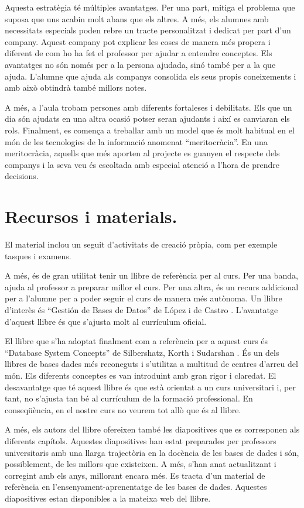 \documentclass[catalan, a4paper, 12pt, titlepage]{article}
\begin{document}
Aquesta estratègia té múltiples avantatges. 
Per una part, mitiga el problema que suposa que uns acabin molt abans que els altres.
A més, els alumnes amb necessitats especials poden rebre un tracte personalitzat i dedicat per part d'un company.
Aquest company pot explicar les coses de manera més propera i diferent de com ho ha fet el professor per ajudar a entendre conceptes.
Els avantatges no són només per a la persona ajudada, sinó també per a la que ajuda.
L'alumne que ajuda als companys consolida els seus propis coneixements i amb això obtindrà també millors notes.

A més, a l'aula trobam persones amb diferents fortaleses i debilitats.
Els que un dia són ajudats en una altra ocasió potser seran ajudants i així es canviaran els rols.
Finalment, es comença a treballar amb un model que és molt habitual en el món de les tecnologies de la informació anomenat ``meritocràcia''.
En una meritocràcia, aquells que més aporten al projecte es guanyen el respecte dels companys i la seva veu és escoltada amb especial atenció a l'hora de prendre decisions.

\section{Recursos i materials.}
\label{sec:recursos_i_materials}

El material inclou un seguit d'activitats de creació pròpia, com per exemple tasques i examens.

A més, és de gran utilitat tenir un llibre de referència per al curs.
Per una banda, ajuda al professor a preparar millor el curs.
Per una altra, és un recurs addicional per a l'alumne per a poder seguir el curs de manera més autònoma.
Un llibre d'interès és ``Gestión de Bases de Datos'' de López i de Castro \cite{montalban2014}.
L'avantatge d'aquest llibre és que s'ajusta molt al currículum oficial.

El llibre que s'ha adoptat finalment com a referència per a aquest curs és ``Database System Concepts'' de Silbershatz, Korth i Sudarshan \cite{silbershatz2020}.
És un dels llibres de bases dades més reconeguts i s'utilitza a multitud de centres d'arreu del món.
Els diferents conceptes es van introduint amb gran rigor i claredat.
El desavantatge que té aquest llibre és que està orientat a un curs universitari i, per tant, no s'ajusta tan bé al currículum de la formació professional.
En conseqüència, en el nostre curs no veurem tot allò que és al llibre.

A més, els autors del llibre ofereixen també les diapositives que es corresponen als diferents capítols.
Aquestes diapositives han estat preparades per professors universitaris amb una llarga trajectòria en la docència de les bases de dades i són, possiblement, de les millors que existeixen.
A més, s'han anat actualitzant i corregint amb els anys, millorant encara més.
Es tracta d'un material de referència en l'ensenyament-aprenentatge de les bases de dades.
Aquestes diapositives estan disponibles a la mateixa web del llibre.
\end{document}
